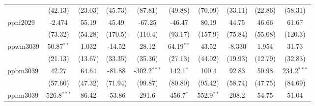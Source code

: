 \begin{table}[htbp]
\begin{tabular}{lccccccccc}
                                     & (42.13)                      & (23.03)                       & (45.73)                     & (87.81)                   & (49.88)                       & (70.09)                      & (33.11)                       & (22.86)                      & (58.31)\\   
      ppnf2029                       & -2.474                       & 55.19                         & 45.49                       & -67.25                    & -46.47                        & 80.19                        & 44.75                         & 46.66                        & 61.67\\   
                                     & (73.32)                      & (54.28)                       & (170.5)                     & (110.4)                   & (93.17)                       & (157.9)                      & (75.84)                       & (55.08)                      & (120.3)\\   
      ppwm3039                       & 50.87$^{**}$                 & 1.032                         & -14.52                      & 28.12                     & 64.19$^{**}$                  & 43.52                        & -8.330                        & 1.954                        & 31.73\\   
                                     & (21.13)                      & (13.67)                       & (33.35)                     & (35.36)                   & (27.13)                       & (44.02)                      & (19.93)                       & (12.79)                      & (32.83)\\   
      ppbm3039                       & 42.27                        & 64.64                         & -81.88                      & -302.2$^{***}$            & 142.1$^{*}$                   & 100.4                        & 92.83                         & 50.98                        & 234.2$^{***}$\\   
                                     & (57.60)                      & (47.32)                       & (71.94)                     & (99.87)                   & (80.80)                       & (95.42)                      & (58.74)                       & (47.75)                      & (84.69)\\   
      ppnm3039                       & 526.8$^{***}$                & 86.42                         & -53.86                      & 291.6                     & 456.7$^{*}$                   & 552.9$^{**}$                 & 208.2                         & 54.75                        & 51.04\\   

\end{tabular}
\end{table}
